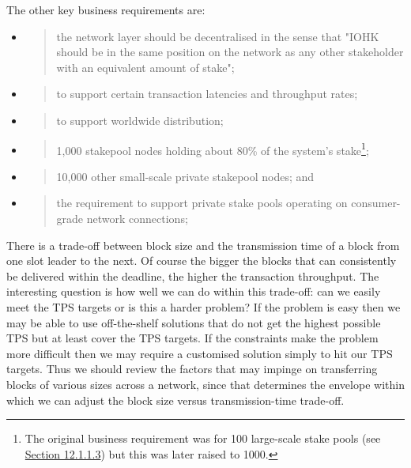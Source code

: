 \documentclass[11pt,a4paper]{article}
\begin{document}
The other key business requirements are:

\begin{itemize}
\item
  \begin{quote}
  the network layer should be decentralised in the sense that "IOHK
  should be in the same position on the network as any other stakeholder
  with an equivalent amount of stake";
  \end{quote}
\item
  \begin{quote}
  to support certain transaction latencies and throughput rates;
  \end{quote}
\item
  \begin{quote}
  to support worldwide distribution;
  \end{quote}
\item
  \begin{quote}
  1,000 stakepool nodes holding about 80\% of the system's
  stake\footnote{The original business requirement was for 100
    large-scale stake pools (see
    \protect\hyperlink{participate-in-network-as-a-large-stakeholder}{Section
    12.1.1.3}) but this was later raised to 1000.};
  \end{quote}
\item
  \begin{quote}
  10,000 other small-scale private stakepool nodes; and
  \end{quote}
\item
  \begin{quote}
  the requirement to support private stake pools operating on
  consumer-grade network connections;
  \end{quote}
\end{itemize}

There is a trade-off between block size and the transmission time of a
block from one slot leader to the next. Of course the bigger the blocks
that can consistently be delivered within the deadline, the higher the
transaction throughput. The interesting question is how well we can do
within this trade-off: can we easily meet the TPS targets or is this a
harder problem? If the problem is easy then we may be able to use
off-the-shelf solutions that do not get the highest possible TPS but at
least cover the TPS targets. If the constraints make the problem more
difficult then we may require a customised solution simply to hit our
TPS targets. Thus we should review the factors that may impinge on
transferring blocks of various sizes across a network, since that
determines the envelope within which we can adjust the block size versus
transmission-time trade-off.
\end{document}
